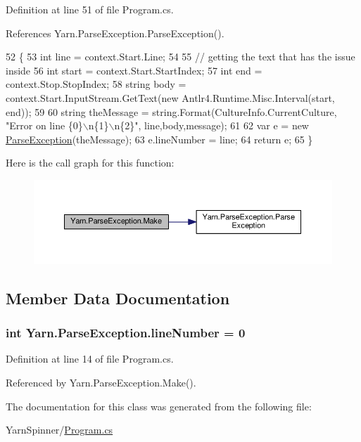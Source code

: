 Definition at line 51 of file Program.\-cs.



References Yarn.\-Parse\-Exception.\-Parse\-Exception().


\begin{DoxyCode}
52         \{
53             \textcolor{keywordtype}{int} line = context.Start.Line;
54 
55             \textcolor{comment}{// getting the text that has the issue inside}
56             \textcolor{keywordtype}{int} start = context.Start.StartIndex;
57             \textcolor{keywordtype}{int} end = context.Stop.StopIndex;
58             \textcolor{keywordtype}{string} body = context.Start.InputStream.GetText(\textcolor{keyword}{new} Antlr4.Runtime.Misc.Interval(start, end));
59 
60             \textcolor{keywordtype}{string} theMessage = string.Format(CultureInfo.CurrentCulture, \textcolor{stringliteral}{"Error on line \{0\}\(\backslash\)n\{1\}\(\backslash\)n\{2\}"}, 
      line,body,message);
61 
62             var e = \textcolor{keyword}{new} \hyperlink{a00147_aa3c4f5c8b0ae86097bbc46044df9f317}{ParseException}(theMessage);
63             e.lineNumber = line;
64             \textcolor{keywordflow}{return} e;
65         \}
\end{DoxyCode}


Here is the call graph for this function\-:
\nopagebreak
\begin{figure}[H]
\begin{center}
\leavevmode
\includegraphics[width=350pt]{a00147_a0265905b09fbd675d40c452d9fc61207_cgraph}
\end{center}
\end{figure}




\subsection{Member Data Documentation}
\hypertarget{a00147_ab335169367e64fd6d89d58b3ac573751}{
\subsubsection[{line\-Number}]{\setlength{\rightskip}{0pt plus 5cm}int Yarn.\-Parse\-Exception.\-line\-Number = 0\hspace{0.3cm}{\ttfamily [package]}}}\label{a00147_ab335169367e64fd6d89d58b3ac573751}


Definition at line 14 of file Program.\-cs.



Referenced by Yarn.\-Parse\-Exception.\-Make().



The documentation for this class was generated from the following file\-:\begin{DoxyCompactItemize}
\item 
Yarn\-Spinner/\hyperlink{a00314}{Program.\-cs}\end{DoxyCompactItemize}
